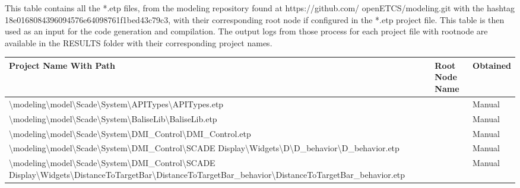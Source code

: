 This table contains all the *.etp files, from the modeling repository found at https://github.com/ openETCS/modeling.git with the hashtag 18e0168084396094576e64098761f1bed43c79c3, with their corresponding root node if configured in the *.etp project file. This table is then used as an input for the code generation and compilation. The output logs from those process for each project file with rootnode are available in the RESULTS folder with their corresponding project names.\\

\begin{longtable}{|>{\RaggedRight}p{}|>{\RaggedRight}p{}|>{\RaggedRight}p{}|} 
\hline
\textbf{Project Name With Path}&\textbf{Root Node Name}&\textbf{Obtained}\\
\hline\endhead
\textbackslash \allowbreak modeling\textbackslash \allowbreak model\textbackslash \allowbreak Scade\textbackslash \allowbreak System\textbackslash \allowbreak APITypes\textbackslash \allowbreak APITypes.etp& &Manual\\
\hline
\textbackslash \allowbreak modeling\textbackslash \allowbreak model\textbackslash \allowbreak Scade\textbackslash \allowbreak System\textbackslash \allowbreak BaliseLib\textbackslash \allowbreak BaliseLib.etp& &Manual\\
\hline
\textbackslash \allowbreak modeling\textbackslash \allowbreak model\textbackslash \allowbreak Scade\textbackslash \allowbreak System\textbackslash \allowbreak DMI\_\allowbreak Control\textbackslash \allowbreak DMI\_\allowbreak Control.etp& &Manual\\
\hline
\textbackslash \allowbreak modeling\textbackslash \allowbreak model\textbackslash \allowbreak Scade\textbackslash \allowbreak System\textbackslash \allowbreak DMI\_\allowbreak Control\textbackslash \allowbreak SCADE Display\textbackslash \allowbreak Widgets\textbackslash \allowbreak D\textbackslash \allowbreak D\_\allowbreak behavior\textbackslash \allowbreak D\_\allowbreak behavior.etp& &Manual\\
\hline
\textbackslash \allowbreak modeling\textbackslash \allowbreak model\textbackslash \allowbreak Scade\textbackslash \allowbreak System\textbackslash \allowbreak DMI\_\allowbreak Control\textbackslash \allowbreak SCADE Display\textbackslash \allowbreak Widgets\textbackslash \allowbreak DistanceToTargetBar\textbackslash \allowbreak DistanceToTargetBar\_\allowbreak behavior\textbackslash \allowbreak DistanceToTargetBar\_\allowbreak behavior.etp& &Manual\\

\end{longtable}
